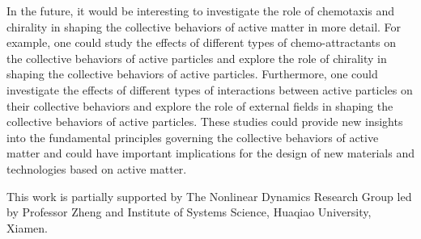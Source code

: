 \documentclass[a4paper, amsfonts, amssymb, amsmath, reprint, showkeys, showpacs, nofootinbib, twoside]{revtex4-2}
\begin{document}
In the future, it would be interesting to investigate the role of chemotaxis and chirality in shaping the collective behaviors of active matter in more detail. For example, one could study the effects of different types of chemo-attractants on the collective behaviors of active particles and explore the role of chirality in shaping the collective behaviors of active particles. Furthermore, one could investigate the effects of different types of interactions between active particles on their collective behaviors and explore the role of external fields in shaping the collective behaviors of active particles. These studies could provide new insights into the fundamental principles governing the collective behaviors of active matter and could have important implications for the design of new materials and technologies based on active matter.

\begin{acknowledgments}
This work is partially supported by The Nonlinear Dynamics Research Group led by Professor Zheng and Institute of Systems Science, Huaqiao University, Xiamen.
\end{acknowledgments}


\end{document}
